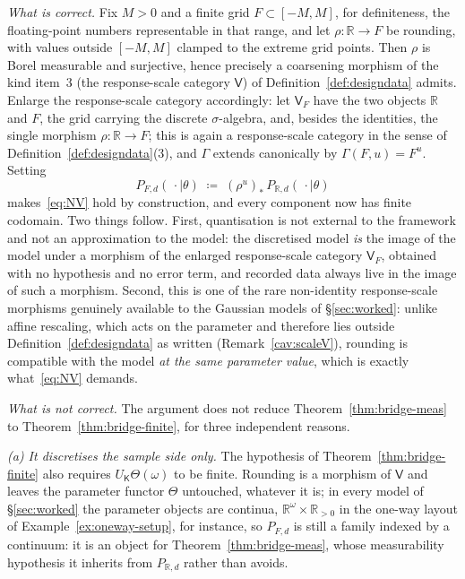 \documentclass[11pt,a4paper]{article}
\theoremstyle{plain}
\theoremstyle{definition}
\theoremstyle{remark}
\newcommand{\cat}[1]{\mathsf{#1}}
\newcommand{\catV}{\cat{V}}
\newcommand{\catK}{\cat{K}}
\newcommand{\R}{\mathbb{R}}
\begin{document}
\emph{What is correct.} Fix $M > 0$ and a finite grid $F \subset [-M,M]$,
for definiteness, the floating-point numbers representable in that range,
and let $\rho \colon \R \to F$ be rounding, with values outside $[-M,M]$
clamped to the extreme grid points. Then $\rho$ is Borel measurable and
surjective, hence precisely a coarsening morphism of the kind item~3 (the
response-scale category $\catV$) of Definition~\ref{def:designdata} admits.
Enlarge the response-scale category accordingly: let $\catV_{F}$ have the two
objects $\R$ and $F$, the grid carrying the discrete $\sigma$-algebra,
and, besides the identities, the single morphism $\rho \colon \R \to F$; this
is again a response-scale category in the sense of
Definition~\ref{def:designdata}(3), and $\Gamma$ extends canonically by
$\Gamma(F,u) = F^{u}$. Setting
\[
P_{F,d}(\,\cdot \mid \theta) \;\coloneqq\; (\rho^{u})_{*}\,P_{\R,d}(\,\cdot
\mid \theta)
\]
makes~\eqref{eq:NV} hold by construction, and every component now has finite
codomain. Two things follow. First, quantisation is not external to the
framework and not an approximation to the model: the discretised model
\emph{is} the image of the model under a morphism of the enlarged response-scale category $\catV_{F}$, obtained with no
hypothesis and no error term, and recorded data always live in the image of
such a morphism. Second, this is one of the rare non-identity response-scale morphisms
genuinely available to the Gaussian models of \S\ref{sec:worked}: unlike affine
rescaling, which acts on the parameter and therefore lies outside
Definition~\ref{def:designdata} as written (Remark~\ref{cav:scaleV}), rounding
is compatible with the model \emph{at the same parameter value}, which is
exactly what~\eqref{eq:NV} demands.

\emph{What is not correct.} The argument does not reduce
Theorem~\ref{thm:bridge-meas} to Theorem~\ref{thm:bridge-finite}, for three
independent reasons.

\emph{(a) It discretises the sample side only.} The hypothesis of
Theorem~\ref{thm:bridge-finite} also requires $U_\catK\Theta(\omega)$ to be
finite. Rounding is a morphism of $\catV$ and leaves the parameter functor
$\Theta$ untouched, whatever it is; in every model of \S\ref{sec:worked} the
parameter objects are continua, $\R^{\omega} \times \R_{>0}$ in the
one-way layout of Example~\ref{ex:oneway-setup}, for instance, so
$P_{F,d}$ is still a family indexed by a continuum: it is an object for
Theorem~\ref{thm:bridge-meas}, whose measurability hypothesis it inherits
from $P_{\R,d}$ rather than avoids.
\end{document}
